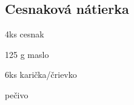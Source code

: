 \setcounter{step}{0}
\subsection{Cesnaková nátierka}

\begin{ingredient}
\begin{main}
	\item 4ks cesnak
	\item 125 g maslo
	\item 6ks karička/črievko
  \item pečivo
\end{main}
\end{ingredient}%
\begin{recipe}


\end{recipe}

\begin{notes}

\end{notes}	

